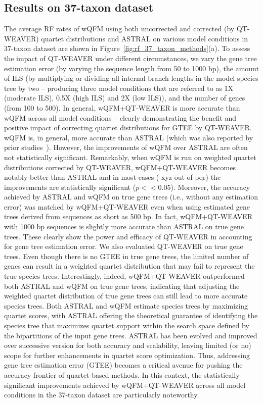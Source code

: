 \documentclass[10pt,a4paper]{article}
\newcommand{\add}[1]{{\color{blue} #1}}
\newcommand{\addb}[1]{{\color{red} #1}}
\begin{document}
\subsection{Results on 37-taxon dataset}
The average RF rates of wQFM using both uncorrected and corrected (by QT-WEAVER) quartet distributions and ASTRAL on various model conditions in 37-taxon dataset are shown in Figure~\ref{fig:rf_37_taxon_methods}(a). To assess the impact of QT-WEAVER under different circumstances, we vary the gene tree estimation error (by varying the sequence length from 50 to 1000 bp), the amount of ILS (by multiplying or dividing all internal branch lengths in the model species tree by two -- producing three model conditions that are referred to as 1X (moderate ILS), 0.5X (high ILS) and 2X (low ILS)), and the number of genes (from 100 to 500). In general, wQFM+QT-WEAVER is more accurate than wQFM across all model conditions -- clearly demonstrating the benefit and positive impact of correcting quartet distributions for GTEE by QT-WEAVER. wQFM is, in general, more accurate than ASTRAL (which was also reported by prior studies~\cite{wqfm,qt-gild}). However, the improvements of wQFM over ASTRAL are often not statistically significant. Remarkably, when wQFM is run on weighted quartet distributions corrected by QT-WEAVER, wQFM+QT-WEAVER becomes notably better than ASTRAL and in most cases (\addb{xyz out of pqr}) the improvements are statistically significant ($p << 0.05$). \add{Moreover, the accuracy achieved by ASTRAL and wQFM on true gene trees (i.e., without any estimation error) was matched by wQFM+QT-WEAVER even when using estimated gene trees derived from sequences as short as 500 bp. In fact, wQFM+QT-WEAVER with 1000 bp sequences is slightly more accurate than ASTRAL on true gene trees. These clearly show the power and efficacy of QT-WEAVER in accounting for gene tree estimation error. We also evaluated QT-WEAVER on true gene trees. %
Even though there is no GTEE in true gene trees, the limited number of genes can result in a weighted quartet distribution that may fail to represent the true species trees. 
Interestingly, indeed,  wQFM+QT-WEAVER outperformed both ASTRAL and wQFM on true gene trees, indicating that adjusting the weighted quartet distribution of true gene trees can still lead to more accurate species trees.}
Both ASTRAL and wQFM estimate species trees by maximizing quartet scores, with ASTRAL offering the theoretical guarantee of identifying the species tree that maximizes quartet support within the search space defined by the bipartitions of the input gene trees. ASTRAL has been evolved and improved over successive version for both accuracy and scalability, leaving limited (or no) scope for further enhancements in quartet score optimization. Thus, addressing gene tree estimation error (GTEE) becomes a critical avenue for pushing the accuracy frontier of quartet-based methods. In this context, the statistically significant improvements achieved by wQFM+QT-WEAVER across all model conditions in the 37-taxon dataset are particularly noteworthy.
\end{document}
